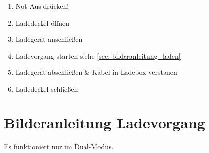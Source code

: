 \begin{enumerate}
    \item Not-Aus drücken!
    \item Ladedeckel öffnen
    \item Ladegerät anschließen
    \item Ladevorgang starten siehe \ref{sec: bilderanleitung_laden}
    \item Ladegerät abschließen \& Kabel in Ladebox verstauen
    \item Ladedeckel schließen
\end{enumerate}

\section{Bilderanleitung Ladevorgang \label{sec: bilderanleitung_laden}}
Es funktioniert nur im Dual-Modus.